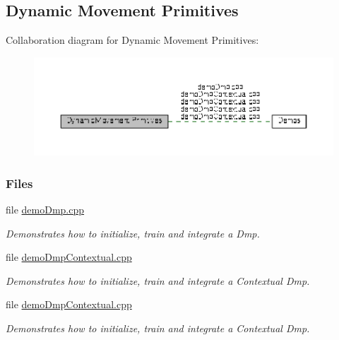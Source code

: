 \hypertarget{group__Dmps}{\subsection{Dynamic Movement Primitives}
\label{group__Dmps}
}
Collaboration diagram for Dynamic Movement Primitives\+:
\nopagebreak
\begin{figure}[H]
\begin{center}
\leavevmode
\includegraphics[width=350pt]{group__Dmps}
\end{center}
\end{figure}
\subsubsection*{Files}
\begin{DoxyCompactItemize}
\item 
file \hyperlink{demoDmp_8cpp}{demo\+Dmp.\+cpp}
\begin{DoxyCompactList}\small\item\em Demonstrates how to initialize, train and integrate a Dmp. \end{DoxyCompactList}\item 
file \hyperlink{demoDmpContextual_8cpp}{demo\+Dmp\+Contextual.\+cpp}
\begin{DoxyCompactList}\small\item\em Demonstrates how to initialize, train and integrate a Contextual Dmp. \end{DoxyCompactList}\item 
file \hyperlink{demoDmpContextual_8cpp}{demo\+Dmp\+Contextual.\+cpp}
\begin{DoxyCompactList}\small\item\em Demonstrates how to initialize, train and integrate a Contextual Dmp. \end{DoxyCompactList}\end{DoxyCompactItemize}
